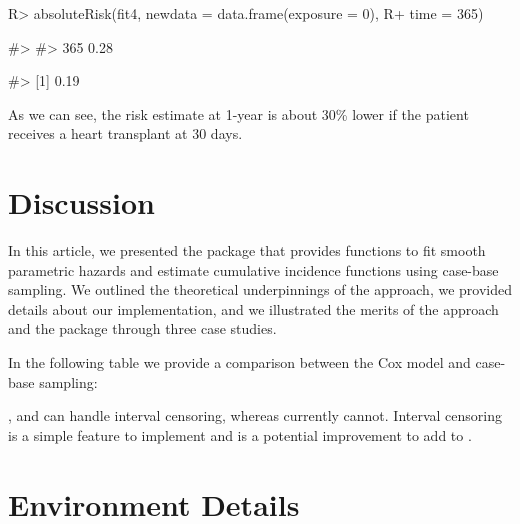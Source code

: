 \documentclass[
]{jss}
\begin{document}
\begin{CodeChunk}

\begin{CodeInput}
R> absoluteRisk(fit4, newdata = data.frame(exposure = 0),
R+              time = 365)
\end{CodeInput}

\begin{CodeOutput}
#>         
#> 365 0.28
\end{CodeOutput}


\begin{CodeOutput}
#> [1] 0.19
\end{CodeOutput}
\end{CodeChunk}

As we can see, the risk estimate at 1-year is about 30\% lower if the
patient receives a heart transplant at 30 days.

\hypertarget{discussion}{%
\section{Discussion}\label{discussion}}

In this article, we presented the  package 
that provides functions to fit smooth parametric hazards and estimate
cumulative incidence functions using case-base sampling. We outlined the
theoretical underpinnings of the approach, we provided details about our
implementation, and we illustrated the merits of the approach and the
package through three case studies.

In the following table we provide a comparison between the Cox model and
case-base sampling:

,  and  can handle interval
censoring, whereas  currently cannot. Interval censoring
is a simple feature to implement and is a potential improvement to add
to .

\hypertarget{environment-details}{%
\section{Environment Details}\label{environment-details}}
\end{document}

